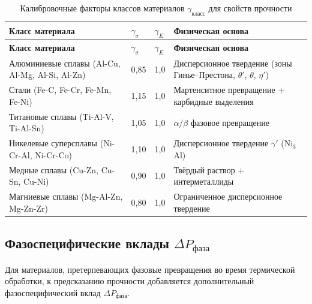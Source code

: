 \documentclass[12pt,a4paper]{article}
\begin{document}
	\begin{longtable}{p{3.5cm}p{2.5cm}p{2.5cm}p{5cm}}
		\caption{Калибровочные факторы классов материалов \(\gamma_{\text{класс}}\) для свойств прочности} \label{tab:material-class-factors} \\
		\toprule
		\textbf{Класс материала} & \(\gamma_{\sigma}\) & \(\gamma_{E}\) & \textbf{Физическая основа} \\
		\midrule
		\endfirsthead
		\toprule
		\textbf{Класс материала} & \(\gamma_{\sigma}\) & \(\gamma_{E}\) & \textbf{Физическая основа} \\
		\midrule
		\endhead
		Алюминиевые сплавы (Al-Cu, Al-Mg, Al-Si, Al-Zn) & 0,85 & 1,0 & Дисперсионное твердение (зоны Гинье–Престона, \(\theta'\), \(\theta\), \(\eta'\)) \\
		Стали (Fe-C, Fe-Cr, Fe-Mn, Fe-Ni) & 1,15 & 1,0 & Мартенситное превращение + карбидные выделения \\
		Титановые сплавы (Ti-Al-V, Ti-Al-Sn) & 1,05 & 1,0 & \(\alpha/\beta\) фазовое превращение \\
		Никелевые суперсплавы (Ni-Cr-Al, Ni-Cr-Co) & 1,10 & 1,0 & Дисперсионное твердение \(\gamma'\) (Ni\(_3\)Al) \\
		Медные сплавы (Cu-Zn, Cu-Sn, Cu-Ni) & 0,90 & 1,0 & Твёрдый раствор + интерметаллиды \\
		Магниевые сплавы (Mg-Al-Zn, Mg-Zn-Zr) & 0,80 & 1,0 & Ограниченное дисперсионное твердение \\
		\bottomrule
	\end{longtable}
	
	\subsection{Фазоспецифические вклады \(\Delta P_{\text{фаза}}\)}
	\label{subsec:phase-contributions}
	
	Для материалов, претерпевающих фазовые превращения во время термической обработки, к предсказанию прочности добавляется дополнительный фазоспецифический вклад \(\Delta P_{\text{фаза}}\).
	
\end{document}
